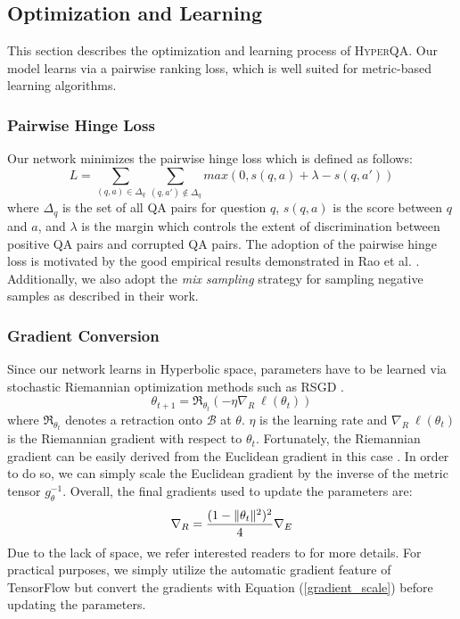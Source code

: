 \documentclass[sigconf]{acmart}
\DeclarePairedDelimiter\norm{\lVert}{\rVert}\fancyhead{}
\begin{document}
\subsection{Optimization and Learning}
This section describes the optimization and learning process of \textsc{HyperQA}. Our model learns via a pairwise ranking loss, which is well suited for metric-based learning algorithms.  
\subsubsection{Pairwise Hinge Loss}
Our network minimizes the pairwise hinge loss which is defined as follows:
\begin{equation}
L =  \sum_{(q,a) \in \Delta_q} \sum_{(q,a') \not\in \Delta_q} max(0,s(q,a) + \lambda - s(q,a'))
\end{equation}
where $\Delta_q$ is the set of all QA pairs for question $q$, $s(q,a)$ is the score between $q$ and $a$, and $\lambda$ is the margin which controls the extent of discrimination between positive QA pairs and corrupted QA pairs. The adoption of the pairwise hinge loss is motivated by the good empirical results demonstrated in Rao et al. \cite{DBLP:conf/cikm/RaoHL16}. Additionally, we also adopt the \textit{mix sampling} strategy for sampling negative samples as described in their work. 

\subsubsection{Gradient Conversion}
Since our network learns in Hyperbolic space, parameters have to be learned via stochastic Riemannian optimization methods such as RSGD \cite{DBLP:journals/tac/Bonnabel13}. 
\begin{equation}
\theta_{t+1} = \Re_{\theta_{t}} (- \eta \nabla_{R} \: \ell (\theta_t))
\end{equation}
where $\Re_{\theta_t}$ denotes a retraction onto $\mathcal{B}$ at $\theta$. $\eta$ is the learning rate and $\nabla_{R} \: \ell (\theta_t)$ is the Riemannian gradient with respect to $\theta_t$. Fortunately, the Riemannian gradient can be easily derived from the Euclidean gradient in this case \cite{DBLP:journals/tac/Bonnabel13}. In order to do so, we can simply scale the Euclidean gradient by the inverse of the metric tensor $g_{\theta}^{-1}$. Overall, the final gradients used to update the parameters are:
\begin{equation}
\label{gradient_scale}
\nabla_{R} = \frac{(1-\norm{\theta_{t}}^2)^{2}}{4} \nabla_{E} 
\end{equation} 
Due to the lack of space, we refer interested readers to \cite{DBLP:journals/corr/NickelK17,DBLP:journals/tac/Bonnabel13} for more details. For practical purposes, we simply utilize the automatic gradient feature of TensorFlow but convert the gradients with Equation (\ref{gradient_scale}) before updating the parameters. 
\end{document}
